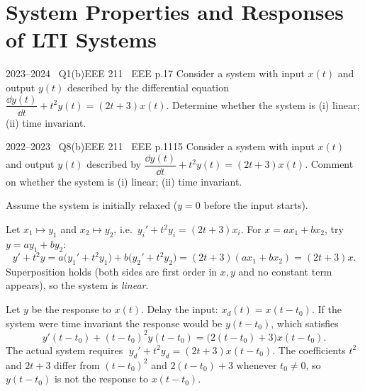 \renewcommand{\teacherTag}{ANIK SIR \textbullet\ LECTURE 3}
\chapter{System Properties and Responses of LTI Systems}

\begin{qcard}{2023--2024 \textbullet\ Q1(b)}{EEE 211 \textbullet\ EEE p.1}{7}
Consider a system with input $x(t)$ and output $y(t)$ described by the differential equation $\dfrac{\dd y(t)}{\dd t}+t^2y(t)=(2t+3)x(t)$. Determine whether the system is (i) linear; (ii) time invariant.
\end{qcard}
\begin{qcard}{2022--2023 \textbullet\ Q8(b)}{EEE 211 \textbullet\ EEE p.11}{15}
Consider a system with input $x(t)$ and output $y(t)$ described by $\dfrac{\dd y(t)}{\dd t}+t^2y(t)=(2t+3)x(t)$. Comment on whether the system is (i) linear; (ii) time invariant.
\end{qcard}
\begin{solution}
Assume the system is initially relaxed ($y=0$ before the input starts).

 Let $x_1\mapsto y_1$ and $x_2\mapsto y_2$, i.e.\ $y_i'+t^2y_i=(2t+3)x_i$. For $x=ax_1+bx_2$, try $y=ay_1+by_2$:
\[
y'+t^2y=a\big(y_1'+t^2y_1\big)+b\big(y_2'+t^2y_2\big)=(2t+3)(ax_1+bx_2)=(2t+3)x .
\]
Superposition holds (both sides are first order in $x,y$ and no constant term appears), so the system is \emph{linear}.

 Let $y$ be the response to $x(t)$. Delay the input: $x_d(t)=x(t-t_0)$. If the system were time invariant the response would be $y(t-t_0)$, which satisfies
\[
y'(t-t_0)+(t-t_0)^2y(t-t_0)=\big(2(t-t_0)+3\big)x(t-t_0).
\]
The actual system requires $\;y_d'+t^2y_d=(2t+3)x(t-t_0)$. The coefficients $t^2$ and $2t+3$ differ from $(t-t_0)^2$ and $2(t-t_0)+3$ whenever $t_0\ne0$, so $y(t-t_0)$ is not the response to $x(t-t_0)$.
\end{solution}

